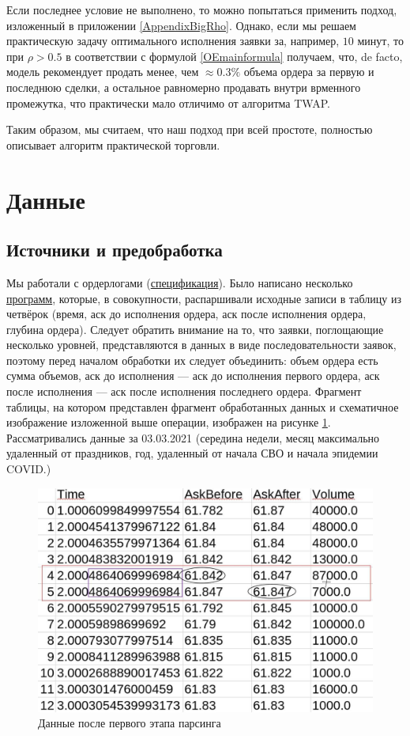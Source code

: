 Если последнее условие не выполнено, то можно попытаться применить подход, изложенный в приложении \ref{AppendixBigRho}.
Однако, если мы решаем практическую задачу оптимального исполнения заявки за, например, $10$ минут, то при $\rho > 0.5$ 
в соответствии с формулой \eqref{OEmainformula} получаем, что, de facto, модель рекомендует продать менее, чем $\approx 0.3\%$ объема
ордера за первую и последнюю сделки, а остальное равномерно продавать внутри врменного промежутка, что практически мало отличимо от 
алгоритма TWAP. 
\par
Таким образом, мы считаем, что наш подход при всей простоте, полностью описывает алгоритм практической торговли. 


\section{Данные}
\subsection{Источники и предобработка}
Мы работали с ордерлогами (\href{https://fs.moex.com/f/3198/specifikacija-formata-dannyh.pdf}{спецификация}). Было написано несколько 
\href{https://github.com/VsevolodZaostrovsky/OWModel/tree/main/New%20data/data%20preparing}{программ},
которые, в совокупности, распаршивали исходные записи в таблицу из четвёрок (время, аск до исполнения ордера, аск после исполнения ордера, глубина ордера). 
Следует обратить внимание на то, что заявки, поглощающие несколько уровней, представляются в данных в виде последовательности заявок, поэтому 
перед началом обработки их следует объединить: объем ордера есть сумма объемов, аск до исполнения --- аск до исполнения первого ордера,
аск после исполнения --- аск после исполнения последнего ордера. Фрагмент таблицы, на котором представлен фрагмент обработанных данных
и схематичное изображение изложенной выше операции, изображен на рисунке \ref{datacsv}.
 Рассматривались данные за 
03.03.2021 (середина недели, месяц максимально удаленный от праздников, 
год, удаленный от начала СВО и начала эпидемии COVID.)
\begin{figure}
    \includegraphics[scale=0.35]{fig/datscsv.jpg}
    \caption{Данные после первого этапа парсинга}
    \label{datacsv}
\end{figure}

